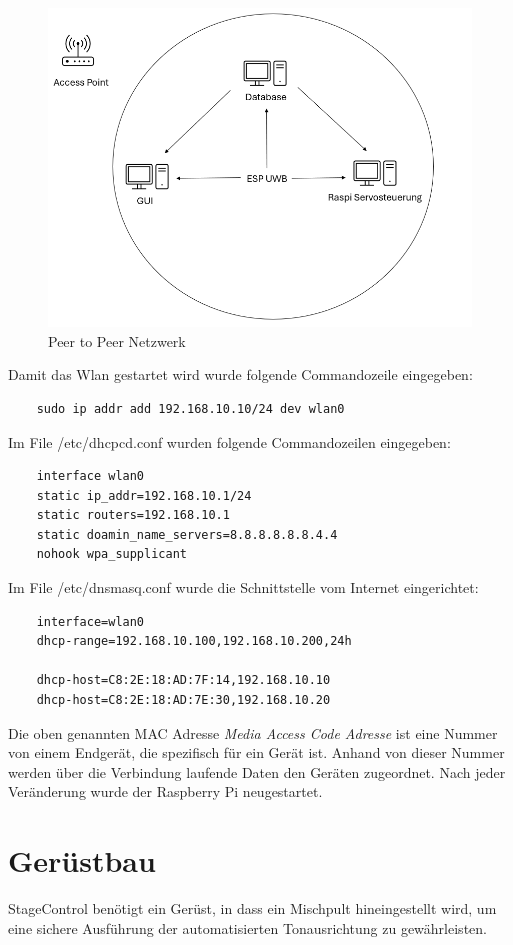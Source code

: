 \begin{figure}[H]
	\centering
	\includegraphics[width=0.5\linewidth]{images/Peer to Peer Netzwerk.png}
	\caption[Peer to Peer Netzwerk]{Peer to Peer Netzwerk}
	\label{fig:Peer to Peer Netzwerk} 
\end{figure}

Damit das Wlan gestartet wird wurde folgende Commandozeile eingegeben: 
\begin{lstlisting}
	sudo ip addr add 192.168.10.10/24 dev wlan0 
\end{lstlisting}

Im File /etc/dhcpcd.conf wurden folgende Commandozeilen eingegeben: 
\begin{lstlisting}
	interface wlan0
	static ip_addr=192.168.10.1/24
	static routers=192.168.10.1
	static doamin_name_servers=8.8.8.8.8.8.4.4
	nohook wpa_supplicant
\end{lstlisting}

Im File /etc/dnsmasq.conf wurde die Schnittstelle vom Internet eingerichtet:
\begin{lstlisting}
	interface=wlan0
	dhcp-range=192.168.10.100,192.168.10.200,24h
	
	dhcp-host=C8:2E:18:AD:7F:14,192.168.10.10
	dhcp-host=C8:2E:18:AD:7E:30,192.168.10.20
\end{lstlisting} 

Die oben genannten MAC Adresse \textit{Media Access Code Adresse} ist eine Nummer von einem Endgerät, die spezifisch für ein Gerät ist. Anhand von dieser Nummer werden über die Verbindung laufende Daten den Geräten zugeordnet. Nach jeder Veränderung wurde der Raspberry Pi neugestartet. 


\section{Gerüstbau}
StageControl benötigt ein Gerüst, in dass ein Mischpult hineingestellt wird, um eine sichere Ausführung der automatisierten Tonausrichtung zu gewährleisten. 


